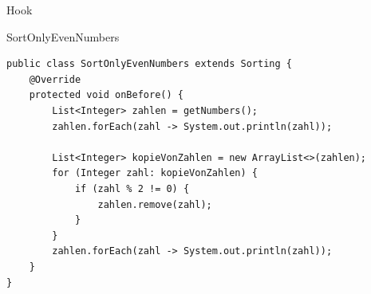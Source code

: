 \begin{frame}[fragile]{Hook}
	\begin{exampleblock}{SortOnlyEvenNumbers}
 		\begin{lstlisting}
public class SortOnlyEvenNumbers extends Sorting {
	@Override
	protected void onBefore() {
		List<Integer> zahlen = getNumbers();
		zahlen.forEach(zahl -> System.out.println(zahl));
		
		List<Integer> kopieVonZahlen = new ArrayList<>(zahlen);
		for (Integer zahl: kopieVonZahlen) {
			if (zahl % 2 != 0) {
				zahlen.remove(zahl);
			}
		}
		zahlen.forEach(zahl -> System.out.println(zahl));
	}
} 		    
 		\end{lstlisting}
 	\end{exampleblock}
\end{frame}
